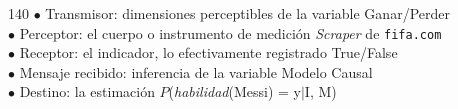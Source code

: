 \documentclass[shownotes,aspectratio=169]{beamer}
\begin{document}
\begin{frame}[plain]
\begin{textblock}{140}
$\bullet$ Transmisor: dimensiones perceptibles de la variable \hfill Ganar/Perder \\

$\bullet$ Perceptor: el cuerpo o instrumento de medición \hfill \textit{Scraper} de \texttt{fifa.com}  \\

$\bullet$ Receptor: el indicador, lo efectivamente registrado \hfill True/False \\

$\bullet$ Mensaje recibido: inferencia de la variable \hfill Modelo Causal \\

$\bullet$ Destino: la estimación  \hfill $P$(\textit{habilidad}(Messi) = y$|$I, M) \\


\end{textblock}


\end{frame}
\end{document}
